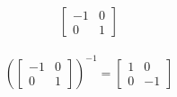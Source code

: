 \begin{align*}
    \begin{bmatrix}
        -1 & 0 \\
        0 & 1
    \end{bmatrix}
\end{align*}

\begin{solution}
    \begin{align*}
        \left(\begin{bmatrix}
            -1 & 0 \\
            0 & 1
        \end{bmatrix}\right)^{-1}
        = \begin{bmatrix}
            1 & 0 \\
            0 & -1
        \end{bmatrix}
    \end{align*}
\end{solution}